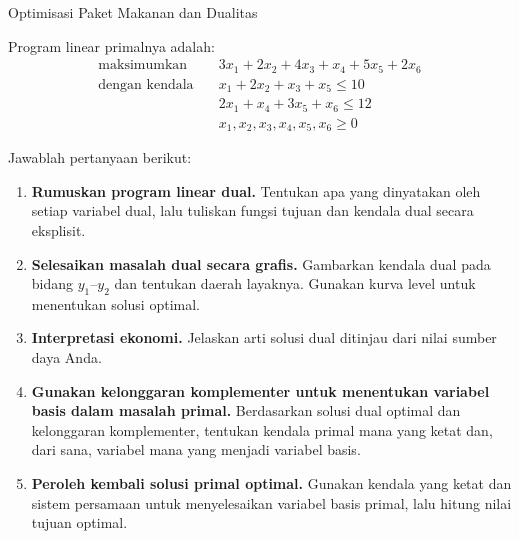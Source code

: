 \begin{ex}{Optimisasi Paket Makanan dan Dualitas}{}
\begin{center}
\end{center}

Program linear primalnya adalah:
\begin{align*}
\text{maksimumkan} \quad & 3x_1 + 2x_2 + 4x_3 + x_4 + 5x_5 + 2x_6 \\
\text{dengan kendala} \quad & x_1 + 2x_2 + x_3 + x_5 \leq 10 \\[-0.5em]
& 2x_1 + x_4 + 3x_5 + x_6 \leq 12 \\
& x_1, x_2, x_3, x_4, x_5, x_6 \geq 0
\end{align*}

Jawablah pertanyaan berikut:
\begin{enumerate}
  \item \textbf{Rumuskan program linear dual.}
  Tentukan apa yang dinyatakan oleh setiap variabel dual, lalu tuliskan fungsi tujuan dan kendala dual secara eksplisit.

  \item \textbf{Selesaikan masalah dual secara grafis.}
  Gambarkan kendala dual pada bidang $y_1$--$y_2$ dan tentukan daerah layaknya. Gunakan kurva level untuk menentukan solusi optimal.

  \item \textbf{Interpretasi ekonomi.}
  Jelaskan arti solusi dual ditinjau dari nilai sumber daya Anda.

  \item \textbf{Gunakan kelonggaran komplementer untuk menentukan variabel basis dalam masalah primal.}
  Berdasarkan solusi dual optimal dan kelonggaran komplementer, tentukan kendala primal mana yang ketat dan, dari sana, variabel mana yang menjadi variabel basis.

  \item \textbf{Peroleh kembali solusi primal optimal.}
  Gunakan kendala yang ketat dan sistem persamaan untuk menyelesaikan variabel basis primal, lalu hitung nilai tujuan optimal.
\end{enumerate}
\exrefs{\S\ref{sec:cs-solving}, \S\ref{sec:duality-economic}}
\end{ex}

